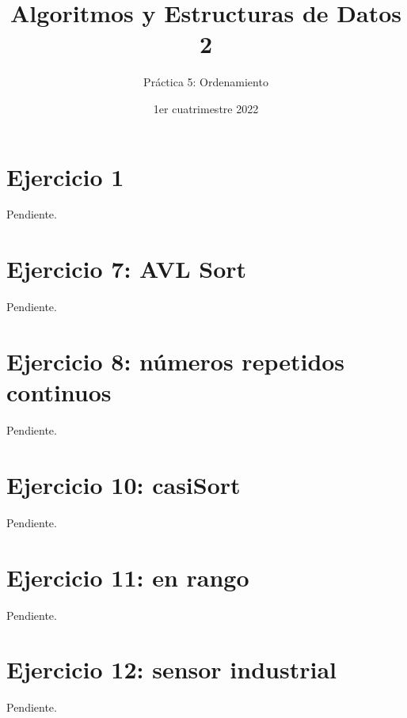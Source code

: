 

\title{Algoritmos y Estructuras de Datos 2}
\author{Práctica 5: Ordenamiento}
\date{1er cuatrimestre 2022}



\maketitle
\tableofcontents
\newpage

\section{Ejercicio 1}

Pendiente.







\section{Ejercicio 7: AVL Sort}

Pendiente.

\section{Ejercicio 8: números repetidos continuos}

Pendiente.



\section{Ejercicio 10: casiSort}

Pendiente.

\section{Ejercicio 11: en rango}

Pendiente.

\section{Ejercicio 12: sensor industrial}

Pendiente.









